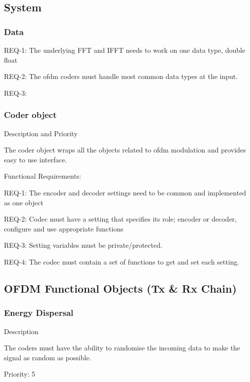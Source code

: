\documentclass[]{report}
\begin{document}
\subsection{System}

\subsubsection{Data}

REQ-1: The underlying FFT and IFFT needs to work on one data type, double float \par
REQ-2: The ofdm coders must handle most common data types at the input. \par
REQ-3: \par

\subsubsection{Coder object}

Description and Priority

The coder object wraps all the objects related to ofdm modulation and provides easy to use interface.

Functional Requirements:

REQ-1: The encoder and decoder settings need to be common and implemented as one object \par
REQ-2: Codec must have a setting that specifies its role; encoder or decoder, configure and use appropriate functions \par
REQ-3: Setting variables must be private/protected. \par
REQ-4: The codec must contain a set of functions to get and set each setting. \par


\subsection{OFDM Functional Objects (Tx \& Rx Chain)}


\subsubsection{Energy Dispersal}

Description  \par
The coders must have the ability to randomise the incoming data to make the signal as random as possible. \par
Priority: 5 \par
\end{document}
